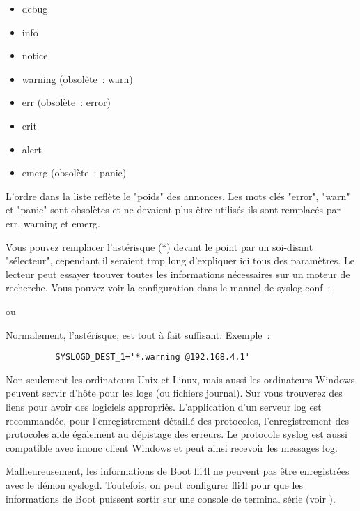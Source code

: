 \begin{description}
  \begin{itemize}
  \item debug
  \item info
  \item notice
  \item warning (obsolète~: warn)
  \item err (obsolète~: error)
  \item crit
  \item alert
  \item emerg (obsolète~: panic)
  \end{itemize}

  L'ordre dans la liste reflète le "poids" des annonces. Les mots
  clés "error", "warn" et "panic" sont obsolètes et ne devaient plus être
  utilisés ils sont remplacés par err, warning et emerg.

  Vous pouvez remplacer l'astérisque (*) devant le point par un soi-disant
  "sélecteur", cependant il seraient trop long d'expliquer ici tous des
  paramètres. Le lecteur peut essayer trouver toutes les informations
  nécessaires sur un moteur de recherche. Vous pouvez voir la configuration
  dans le manuel de syslog.conf~:

  \enlargethispage{\baselineskip}
  \noindent {} ou\\

  Normalement, l'astérisque, est tout à fait suffisant. Exemple~:
\begin{example}
\begin{verbatim}
          SYSLOGD_DEST_1='*.warning @192.168.4.1'
\end{verbatim}
\end{example}

  Non seulement les ordinateurs Unix et Linux, mais aussi les ordinateurs Windows
  peuvent servir d'hôte pour les logs (ou fichiers journal). Sur
   vous trouverez des liens
  pour avoir des logiciels appropriés. L'application d'un serveur log est recommandée,
  pour l'enregistrement détaillé des protocoles, l'enregistrement des protocoles
  aide également au dépistage des erreurs. Le protocole syslog est aussi
  compatible avec imonc client Windows et peut ainsi recevoir les messages log.

  Malheureusement, les informations de Boot fli4l ne peuvent pas être
  enregistrées avec le démon syslogd. Toutefois, on peut configurer fli4l pour
  que les informations de Boot puissent sortir sur une console de terminal
  série (voir ).


\end{description}
